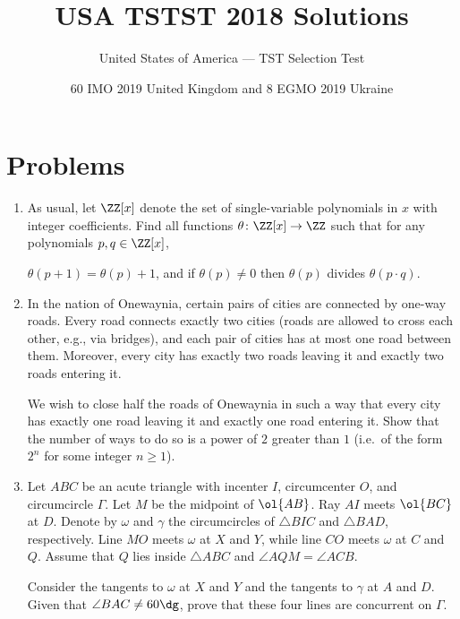 \documentclass[11pt]{scrartcl}
\begin{document}
\title{USA TSTST 2018 Solutions}
\subtitle{United States of America --- TST Selection Test}
\date{60 IMO 2019 United Kingdom and 8 EGMO 2019 Ukraine}

\maketitle

\tableofcontents
\newpage

\addtocounter{section}{-1}
\section{Problems}
\begin{enumerate}[\bfseries 1.]
\item %
As usual, let $\ZZ[x]$ denote the set of single-variable
polynomials in $x$ with integer coefficients.
Find all functions $\theta \colon \ZZ[x] \to \ZZ$
such that for any polynomials $p,q \in \ZZ[x]$,
\begin{itemize}
  \ii $\theta(p+1) = \theta(p)+1$, and
  \ii if $\theta(p) \neq 0$
  then $\theta(p)$ divides $\theta(p \cdot q)$.
\end{itemize}

\item %
In the nation of Onewaynia,
certain pairs of cities are connected by one-way roads.
Every road connects exactly two cities
(roads are allowed to cross each other, e.g., via bridges),
and each pair of cities has at most one road between them.
Moreover, every city has exactly two roads leaving it and
exactly two roads entering it.

We wish to close half the roads of Onewaynia in such a way that
every city has exactly one road leaving it and exactly one road entering it.
Show that the number of ways to do so is a power of $2$ greater than $1$
(i.e.\ of the form $2^n$ for some integer $n \ge 1$).

\item %
Let $ABC$ be an acute triangle
with incenter $I$, circumcenter $O$, and circumcircle $\Gamma$.
Let $M$ be the midpoint of $\ol{AB}$.
Ray $AI$ meets $\ol{BC}$ at $D$.
Denote by $\omega$ and $\gamma$
the circumcircles of $\triangle BIC$ and $\triangle BAD$, respectively.
Line $MO$ meets $\omega$ at $X$ and $Y$,
while line $CO$ meets $\omega$ at $C$ and $Q$.
Assume that $Q$ lies inside $\triangle ABC$
and $\angle AQM = \angle ACB$.

Consider the tangents to $\omega$ at $X$ and $Y$
and the tangents to $\gamma$ at $A$ and $D$.
Given that $\angle BAC \neq 60\dg$,
prove that these four lines are concurrent on $\Gamma$.


\end{enumerate}
\end{document}

